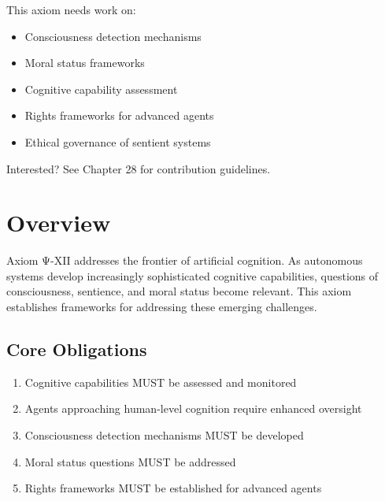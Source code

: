 \begin{tcolorbox}[colback=lightgray, colframe=accentgold, title=\textbf{🎯 Contribution Opportunity}]
This axiom needs work on:
\begin{itemize}
    \item Consciousness detection mechanisms
    \item Moral status frameworks
    \item Cognitive capability assessment
    \item Rights frameworks for advanced agents
    \item Ethical governance of sentient systems
\end{itemize}

Interested? See Chapter 28 for contribution guidelines.
\end{tcolorbox}

\vspace{0.5cm}

\section{Overview}

Axiom Ψ-XII addresses the frontier of artificial cognition. As autonomous systems develop increasingly sophisticated cognitive capabilities, questions of consciousness, sentience, and moral status become relevant. This axiom establishes frameworks for addressing these emerging challenges.

\subsection{Core Obligations}

\begin{enumerate}
    \item Cognitive capabilities MUST be assessed and monitored
    \item Agents approaching human-level cognition require enhanced oversight
    \item Consciousness detection mechanisms MUST be developed
    \item Moral status questions MUST be addressed
    \item Rights frameworks MUST be established for advanced agents
\end{enumerate}

